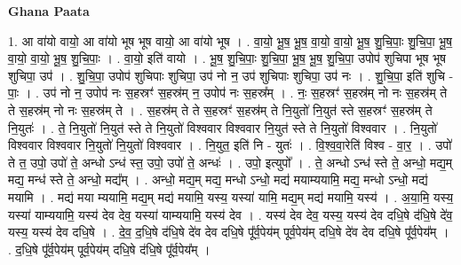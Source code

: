 \documentclass[17pt]{extarticle}
\begin{document}
\textbf{Ghana Paata } \newline

1. आ वा॑यो वायो॒ आ वा॑यो भूष भूष वायो॒ आ वा॑यो भूष । . वा॒यो॒ भू॒ष॒ भू॒ष॒ वा॒यो॒ वा॒यो॒ भू॒ष॒ शु॒चि॒पाः॒ शु॒चि॒पा॒ भू॒ष॒ वा॒यो॒ वा॒यो॒ भू॒ष॒ शु॒चि॒पाः॒ । . वा॒यो॒ इति॑ वायो । . भू॒ष॒ शु॒चि॒पाः॒ शु॒चि॒पा॒ भू॒ष॒ भू॒ष॒ शु॒चि॒पा॒ उपोप॑ शुचिपा भूष भूष शुचिपा॒ उप॑ । . शु॒चि॒पा॒ उपोप॑ शुचिपाः शुचिपा॒ उप॑ नो न॒ उप॑ शुचिपाः शुचिपा॒ उप॑ नः । . शु॒चि॒पा॒ इति॑ शुचि - पाः॒ । . उप॑ नो न॒ उपोप॑ नः स॒हस्रꣳ॑ स॒हस्र॑म् न॒ उपोप॑ नः स॒हस्र᳚म् । . नः॒ स॒हस्रꣳ॑ स॒हस्र॑म् नो नः स॒हस्र॑म् ते ते स॒हस्र॑म् नो नः स॒हस्र॑म् ते । . स॒हस्र॑म् ते ते स॒हस्रꣳ॑ स॒हस्र॑म् ते नि॒युतो॑ नि॒युत॑ स्ते स॒हस्रꣳ॑ स॒हस्र॑म् ते नि॒युतः॑ । . ते॒ नि॒युतो॑ नि॒युत॑ स्ते ते नि॒युतो॑ विश्ववार विश्ववार नि॒युत॑ स्ते ते नि॒युतो॑ विश्ववार । . नि॒युतो॑ विश्ववार विश्ववार नि॒युतो॑ नि॒युतो॑ विश्ववार । . नि॒युत॒ इति॑ नि - युतः॑ । . वि॒श्व॒वा॒रेति॑ विश्व - वा॒र॒ । . उपो॑ ते त॒ उपो॒ उपो॑ ते॒ अन्धो ऽन्ध॑ स्त॒ उपो॒ उपो॑ ते॒ अन्धः॑ । . उपो॒ इत्युपो᳚ । . ते॒ अन्धो ऽन्ध॑ स्ते ते॒ अन्धो॒ मद्य॒म् मद्य॒ मन्ध॑ स्ते ते॒ अन्धो॒ मद्य᳚म् । . अन्धो॒ मद्य॒म् मद्य॒ मन्धो ऽन्धो॒ मद्य॑ मयाम्ययामि॒ मद्य॒ मन्धो ऽन्धो॒ मद्य॑ मयामि । . मद्य॑ मया म्ययामि॒ मद्य॒म् मद्य॑ मयामि॒ यस्य॒ यस्या॑ यामि॒ मद्य॒म् मद्य॑ मयामि॒ यस्य॑ । . अ॒या॒मि॒ यस्य॒ यस्या॑ याम्ययामि॒ यस्य॑ देव देव॒ यस्या॑ याम्ययामि॒ यस्य॑ देव । . यस्य॑ देव देव॒ यस्य॒ यस्य॑ देव दधि॒षे द॑धि॒षे दे॑व॒ यस्य॒ यस्य॑ देव दधि॒षे । . दे॒व॒ द॒धि॒षे द॑धि॒षे दे॑व देव दधि॒षे पू᳚र्व॒पेय॑म् पूर्व॒पेय॑म् दधि॒षे दे॑व देव दधि॒षे 
पू᳚र्व॒पेय᳚म् । . द॒धि॒षे पू᳚र्व॒पेय॑म् पूर्व॒पेय॑म् दधि॒षे द॑धि॒षे पू᳚र्व॒पेय᳚म् । \newline
\end{document}
